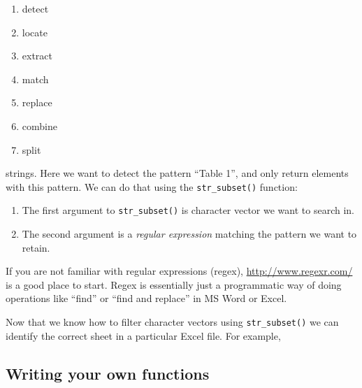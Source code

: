 \documentclass[]{book}
\newenvironment{Shaded}{\begin{snugshade}}{\end{snugshade}}
\newcommand{\KeywordTok}[1]{\textcolor[rgb]{0.13,0.29,0.53}{\textbf{#1}}}
\newcommand{\DataTypeTok}[1]{\textcolor[rgb]{0.13,0.29,0.53}{#1}}
\newcommand{\DecValTok}[1]{\textcolor[rgb]{0.00,0.00,0.81}{#1}}
\newcommand{\StringTok}[1]{\textcolor[rgb]{0.31,0.60,0.02}{#1}}
\newcommand{\CommentTok}[1]{\textcolor[rgb]{0.56,0.35,0.01}{\textit{#1}}}
\newcommand{\OperatorTok}[1]{\textcolor[rgb]{0.81,0.36,0.00}{\textbf{#1}}}
\newcommand{\NormalTok}[1]{#1}
\providecommand{\tightlist}{%
  \setlength{\itemsep}{0pt}\setlength{\parskip}{0pt}}
\begin{document}
\begin{enumerate}
\def\labelenumi{\arabic{enumi}.}
\tightlist
\item
  detect
\item
  locate
\item
  extract
\item
  match
\item
  replace
\item
  combine
\item
  split
\end{enumerate}

strings. Here we want to detect the pattern ``Table 1'', and only return
elements with this pattern. We can do that using the
\texttt{str\_subset()} function:

\begin{enumerate}
\def\labelenumi{\arabic{enumi}.}
\tightlist
\item
  The first argument to \texttt{str\_subset()} is character vector we
  want to search in.
\item
  The second argument is a \emph{regular expression} matching the
  pattern we want to retain.
\end{enumerate}

If you are not familiar with regular expressions (regex),
\url{http://www.regexr.com/} is a good place to start. Regex is
essentially just a programmatic way of doing operations like ``find'' or
``find and replace'' in MS Word or Excel.

Now that we know how to filter character vectors using
\texttt{str\_subset()} we can identify the correct sheet in a particular
Excel file. For example,

\begin{Shaded}
\end{Shaded}

\subsection{Writing your own
functions}\label{writing-your-own-functions}
\end{document}
